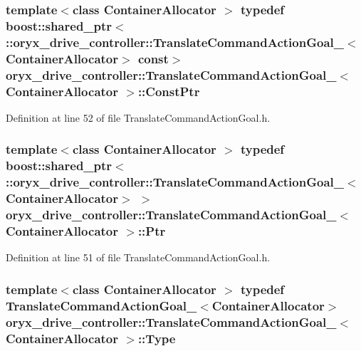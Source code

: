 \subsubsection[{\-Const\-Ptr}]{\setlength{\rightskip}{0pt plus 5cm}template$<$class Container\-Allocator $>$ typedef boost\-::shared\-\_\-ptr$<$ \-::{\bf oryx\-\_\-drive\-\_\-controller\-::\-Translate\-Command\-Action\-Goal\-\_\-}$<$\-Container\-Allocator$>$ const$>$ {\bf oryx\-\_\-drive\-\_\-controller\-::\-Translate\-Command\-Action\-Goal\-\_\-}$<$ \-Container\-Allocator $>$\-::{\bf \-Const\-Ptr}}\label{structoryx__drive__controller_1_1TranslateCommandActionGoal___a24283444cc66144c0b3fab4d7e5bbb5c}


\-Definition at line 52 of file \-Translate\-Command\-Action\-Goal.\-h.

\subsubsection[{\-Ptr}]{\setlength{\rightskip}{0pt plus 5cm}template$<$class Container\-Allocator $>$ typedef boost\-::shared\-\_\-ptr$<$ \-::{\bf oryx\-\_\-drive\-\_\-controller\-::\-Translate\-Command\-Action\-Goal\-\_\-}$<$\-Container\-Allocator$>$ $>$ {\bf oryx\-\_\-drive\-\_\-controller\-::\-Translate\-Command\-Action\-Goal\-\_\-}$<$ \-Container\-Allocator $>$\-::{\bf \-Ptr}}\label{structoryx__drive__controller_1_1TranslateCommandActionGoal___ad5f19e16da256b0564f43d5346b27e68}


\-Definition at line 51 of file \-Translate\-Command\-Action\-Goal.\-h.

\subsubsection[{\-Type}]{\setlength{\rightskip}{0pt plus 5cm}template$<$class Container\-Allocator $>$ typedef {\bf \-Translate\-Command\-Action\-Goal\-\_\-}$<$\-Container\-Allocator$>$ {\bf oryx\-\_\-drive\-\_\-controller\-::\-Translate\-Command\-Action\-Goal\-\_\-}$<$ \-Container\-Allocator $>$\-::{\bf \-Type}}\label{structoryx__drive__controller_1_1TranslateCommandActionGoal___a12b9bdaef207bb4f030bfdcf71b3f106}


